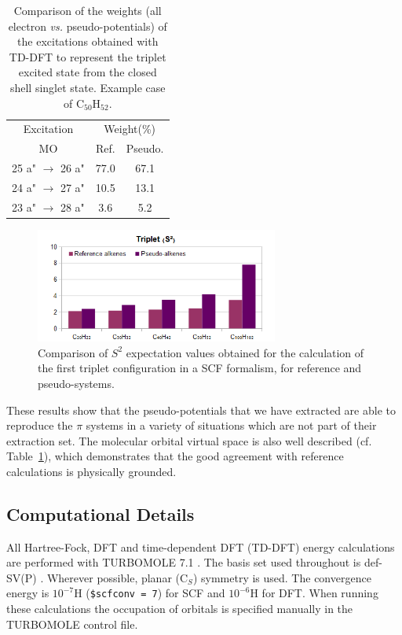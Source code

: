 \documentclass[journal=jctcce,manuscript=article]{achemso}
\begin{document}
\begin{table}
\caption{\label{tab:coef}Comparison of the weights (all electron \emph{vs.} pseudo-potentials)
of the excitations obtained with TD-DFT
to represent the triplet excited state from the closed shell singlet state.
Example case of C$_{50}$H$_{52}$.}
\begin{tabular}{c c c c}
\hline
\multicolumn{2}{c}{Excitation} & \multicolumn{2}{c}{Weight(\%)}\\
\multicolumn{2}{c}{MO} & Ref. & Pseudo.\\
\hline
\multicolumn{2}{c}{25 a" \(\rightarrow\) 26 a"} & 77.0 &   67.1  \\
\multicolumn{2}{c}{24 a" \(\rightarrow\) 27 a"} & 10.5 &   13.1  \\
\multicolumn{2}{c}{23 a" \(\rightarrow\) 28 a"} & 3.6  &    5.2  \\
\hline
\end{tabular}
\end{table}

\begin{figure}
\includegraphics[width=8cm]{ssquare}
\caption{Comparison of $S^2$ expectation values obtained for the calculation
of the first triplet configuration in a SCF formalism, for reference
and pseudo-systems.}
\label{fig:ssquare}
\end{figure}

These results show that the pseudo-potentials that we have extracted are able to reproduce the
$\pi$ systems in a variety of situations which are not part of their extraction set.
The molecular orbital virtual space is also well described (cf. Table~\ref{tab:coef}),
which demonstrates that the good agreement with reference calculations is
physically grounded.

\subsection{Computational Details}

All Hartree-Fock, DFT and time-dependent DFT (TD-DFT) energy calculations are performed with TURBOMOLE 7.1 \cite{TURBOMOLE}. The basis set used throughout is def-SV(P) \cite{defsvp}. Wherever possible, planar (C\(_{S}\)) symmetry is used. The convergence energy is \(10^{-7}\)H (\texttt{\$scfconv = 7}) for SCF and \(10^{-6}\)H for DFT. When running these calculations the occupation of orbitals is specified manually in the TURBOMOLE control file.
\end{document}

